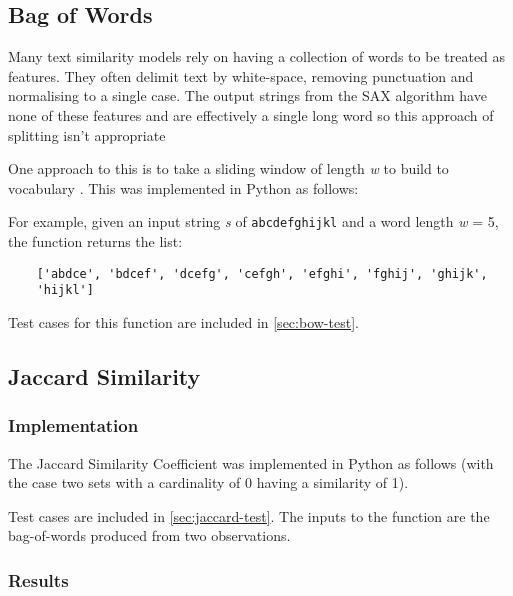 \documentclass[../report.tex]{subfiles}
\begin{document}
\subsection{Bag of Words} \label{sec:bow}
	Many text similarity models rely on having a collection of words to be treated as features.  They often delimit text by white-space, removing punctuation and normalising to a single case.  The output strings from the SAX algorithm have none of these features and are effectively a single long word so this approach of splitting isn't appropriate
	
	One approach to this is to take a sliding window of length \textit{w} to build to vocabulary \citep{sax-hot}.  This was implemented in Python as follows:



	For example, given an input string \textit{s} of \verb|abcdefghijkl| and a word length \textit{w} = 5, the function returns the list: 
\begin{verbatim}
	['abdce', 'bdcef', 'dcefg', 'cefgh', 'efghi', 'fghij', 'ghijk', 
	'hijkl']
\end{verbatim}

	Test cases for this function are included in \cref{sec:bow-test}.


\subsection{Jaccard Similarity} \label{sec:jaccard}
\begin{minipage}{\linewidth}
\subsubsection{Implementation}
	The Jaccard Similarity Coefficient was implemented in Python as follows (with the case two sets with a cardinality of 0 having a similarity of 1).



	Test cases are included in \cref{sec:jaccard-test}.  The inputs to the function are the bag-of-words produced from two observations.
\end{minipage}
	
\subsubsection{Results}
\end{document}

